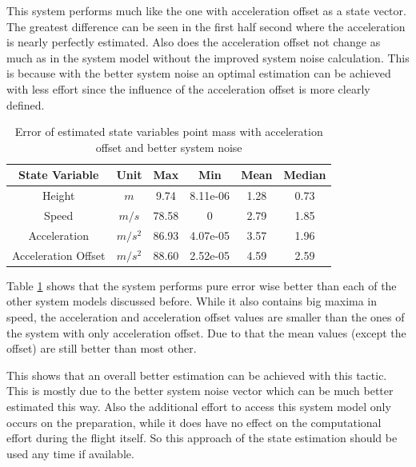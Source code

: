 This system performs much like the one with acceleration offset as a state vector.
The greatest difference can be seen in the first half second where the acceleration is nearly perfectly estimated.
Also does the acceleration offset not change as much as in the system model without the improved system noise calculation.
This is because with the better system noise an optimal estimation can be achieved with less effort since the influence of the acceleration offset is more clearly defined.

\begin{table}[h!]
\centering
\begin{tabular}{cccccc}
\hline
\multicolumn{1}{|c|}{State Variable} & \multicolumn{1}{c|}{Unit} & \multicolumn{1}{c|}{Max} & \multicolumn{1}{c|}{Min} & \multicolumn{1}{c|}{Mean} & \multicolumn{1}{c|}{Median} \\ \hline
Height                            & $m$                         & 9.74	                  & 8.11e-06                 & 1.28                    & 0.73                      \\
Speed                             & $m/s$                       & 78.58                   & 0                        & 2.79                    & 1.85                      \\
Acceleration                       & $m/s^2$   			& 86.93                   & 4.07e-05                 & 3.57                    & 1.96                     \\
Acceleration Offset                & $m/s^2$   			& 88.60                   & 2.52e-05                 & 4.59                    & 2.59
\end{tabular}
\caption{Error of estimated state variables point mass with acceleration offset and better system noise}
\label{tab:ErrorPointMassBetterNoise}
\end{table}

Table \ref{tab:ErrorPointMassBetterNoise} shows that the system performs pure error wise better than each of the other system models discussed before.
While it also contains big maxima in speed, the acceleration and acceleration offset values are smaller than the ones of the system with only acceleration offset.
Due to that the mean values (except the offset) are still better than most other.

This shows that an overall better estimation can be achieved with this tactic.
This is mostly due to the better system noise vector which can be much better estimated this way.
Also the additional effort to access this system model only occurs on the preparation,
while it does have no effect on the computational effort during the flight itself.
So this approach of the state estimation should be used any time if available.

